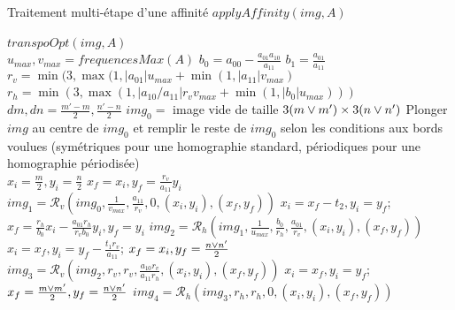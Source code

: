    \begin{algorithme}
    \label{algoPresqueAussiUniqueQueLesDeuxAutres}
    \caption{Traitement multi-étape d'une affinité $applyAffinity(img,A)$}
    $transpoOpt(img,A)$\;\ \\
    $u_{max}, v_{max} = frequencesMax(A)$\;
	$b_0 = a_{00}-\frac{a_{01}a_{10}}{a_{11}}$\;
	$b_1 = \frac{a_{01}}{a_{11}}$\;
	$r_v = \min(3,\max (1,|a_{01}|u_{max}+\min (1,|a_{11}|v_{max})$\;
	$r_h = \min(3,\max (1,|a_{10}/a_{11}|r_vv_{max}+\min (1,|b_0|u_{max})))$\;
	\ \\
	$dm,dn = \frac{m'-m}{2},\frac{n'-n}{2}$\;
	$img_0 = $ image vide de taille $3(m \vee m') \times 3(n \vee n')$\;
	Plonger $img$ au centre de $img_0$ et remplir le reste de $img_0$ selon les conditions aux bords voulues (symétriques pour une homographie standard, périodiques pour une homographie périodisée)\;
	\ \\
	$x_i = \frac{m}{2}, y_i = \frac{n}{2}$\;
	$x_f = x_i, y_f = \frac{r_v}{a_{11}}y_i$\;
	$img_1 = \mathcal{R}_v(img_0,\frac{1}{v_{max}},\frac{a_{11}}{r_v},0,(x_i,y_i),(x_f,y_f))$\;
	$x_i = x_f-t_2, y_i = y_f$;
	$x_f = \frac{r_h}{b_0} x_i - \frac{a_{01}r_h}{r_v b_0} y_i, y_f = y_i$\;
	$img_2 = \mathcal{R}_h(img_1,\frac{1}{u_{max}},\frac{b_0}{r_h},\frac{a_{01}}{r_v},(x_i,y_i),(x_f,y_f))$\;
	$x_i = x_f, y_i = y_f - \frac{t_1r_v}{a_{11}}$;
	$x_f = x_i, y_f = \frac{n \vee n'}{2}$\;
	$img_3 = \mathcal{R}_v(img_2,r_v,r_v,\frac{a_{10}r_v}{a_{11}r_h},(x_i,y_i),(x_f,y_f))$\;
	$x_i = x_f, y_i = y_f$;
	$x_f = \frac{m \vee m'}{2}, y_f = \frac{n \vee n'}{2}$\;
	$img_4 = \mathcal{R}_h(img_3,r_h,r_h,0,(x_i,y_i),(x_f,y_f))$\;
   \end{algorithme}
